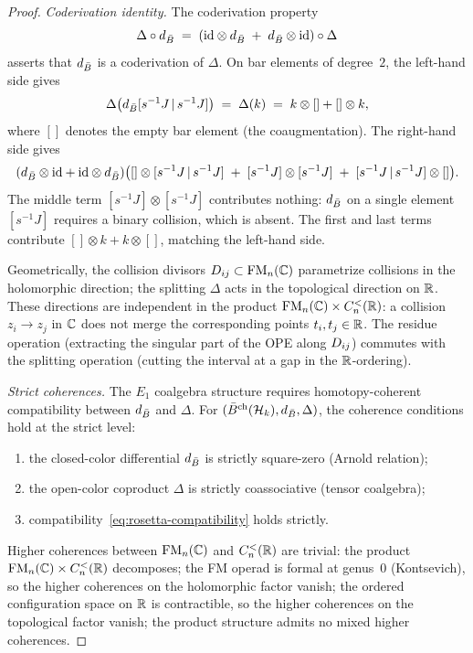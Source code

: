 \begin{proof}
\medskip
\noindent\textit{Coderivation identity.}\enspace
The coderivation property
\begin{equation}\label{eq:rosetta-compatibility}
\Delta \circ d_{\bar{B}}
\;=\;
(\mathrm{id} \otimes d_{\bar{B}} \;+\; d_{\bar{B}} \otimes \mathrm{id})
\circ \Delta
\end{equation}
asserts that $d_{\bar{B}}$ is a coderivation of $\Delta$. On bar elements of degree~$2$, the left-hand side gives
\[
\Delta\bigl(d_{\bar{B}}[s^{-1}J \,|\, s^{-1}J]\bigr)
\;=\;
\Delta(k)
\;=\;
k \otimes [] + [] \otimes k,
\]
where $[]$ denotes the empty bar element (the coaugmentation).
The right-hand side gives
\[
(d_{\bar{B}} \otimes \mathrm{id} + \mathrm{id} \otimes d_{\bar{B}})\bigl(
 [] \otimes [s^{-1}J \,|\, s^{-1}J]
 \;+\;
 [s^{-1}J] \otimes [s^{-1}J]
 \;+\;
 [s^{-1}J \,|\, s^{-1}J] \otimes []
\bigr).
\]
The middle term $[s^{-1}J] \otimes [s^{-1}J]$ contributes nothing: $d_{\bar{B}}$ on a single element $[s^{-1}J]$ requires a binary collision, which is absent. The first and last terms contribute $[] \otimes k + k \otimes []$, matching the left-hand side.

Geometrically, the collision divisors $D_{ij} \subset \mathrm{FM}_n(\mathbb{C})$ parametrize collisions in the holomorphic direction; the splitting $\Delta$ acts in the topological direction on $\mathbb{R}$. These directions are independent in the product $\mathrm{FM}_n(\mathbb{C}) \times C_n^{<}(\mathbb{R})$: a collision $z_i \to z_j$ in $\mathbb{C}$ does not merge the corresponding points $t_i, t_j \in \mathbb{R}$. The residue operation (extracting the singular part of the OPE along $D_{ij}$) commutes with the splitting operation (cutting the interval at a gap in the $\mathbb{R}$-ordering).

\medskip
\noindent\textit{Strict coherences.}\enspace
The $E_1$ coalgebra structure requires homotopy-coherent compatibility between $d_{\bar{B}}$ and $\Delta$. For $(\bar{B}^{\mathrm{ch}}(\mathcal{H}_k), d_{\bar{B}}, \Delta)$, the coherence conditions hold at the strict level:
\begin{enumerate}[label=(\alph*)]
\item the closed-color differential $d_{\bar{B}}$ is strictly square-zero (Arnold relation);
\item the open-color coproduct $\Delta$ is strictly coassociative (tensor coalgebra);
\item compatibility~\eqref{eq:rosetta-compatibility} holds strictly.
\end{enumerate}
Higher coherences between $\mathrm{FM}_n(\mathbb{C})$ and $C_n^{<}(\mathbb{R})$ are trivial: the product $\mathrm{FM}_n(\mathbb{C}) \times C_n^{<}(\mathbb{R})$ decomposes; the FM operad is formal at genus~$0$ (Kontsevich), so the higher coherences on the holomorphic factor vanish; the ordered configuration space on $\mathbb{R}$ is contractible, so the higher coherences on the topological factor vanish; the product structure admits no mixed higher coherences.
\end{proof}


